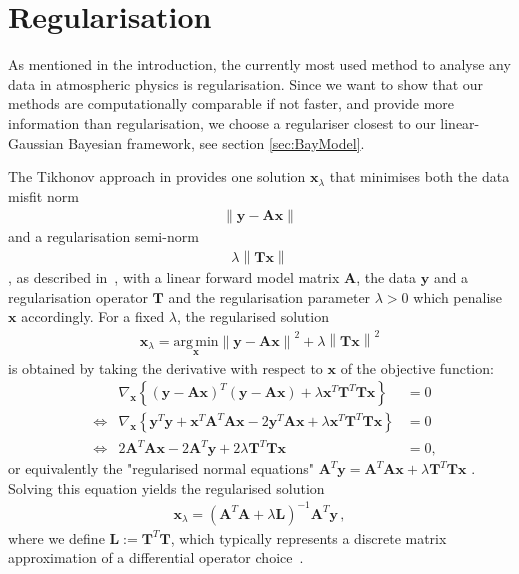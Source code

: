 \section{Regularisation}
\label{sec:regularise}
As mentioned in the introduction, the currently most used method to analyse any data in atmospheric physics is regularisation.
Since we want to show that our methods are computationally comparable if not faster, and provide more information than regularisation, we choose a regulariser closest to our linear-Gaussian Bayesian framework, see section \ref{sec:BayModel}.

The Tikhonov approach in provides one solution $\bm{x}_{\lambda}$ that minimises both the data misfit norm
\begin{align}
	\left\lVert \bm{y} - \bm{A} \bm{x} \right\rVert
\end{align} and a regularisation semi-norm
\begin{align}
	\lambda \left\lVert \bm{T} \bm{x} \right\rVert
\end{align}, as described in~\cite{fox2016fast}, with a linear forward model matrix $\bm{A}$, the data $\bm{y}$ and a regularisation operator $\bm{T}$ and the regularisation parameter $\lambda > 0$ which penalise $\bm{x}$ accordingly.
For a fixed $\lambda$, the regularised solution
\begin{align}
	\bm{x}_{\lambda} = \underset{\bm{x}}{\mathrm{arg\,min}} \left\lVert \bm{y} - \bm{A} \bm{x} \right\rVert^2 + \lambda \left\lVert \bm{T} \bm{x} \right\rVert^2
\end{align}
is obtained by taking the derivative with respect to $\bm{x}$ of the objective function:
\begin{align}
	& & \nabla_{\bm{x}} \left\{ (\bm{y} - \bm{A} \bm{x})^T (\bm{y} - \bm{A} \bm{x}) + \lambda \bm{x}^T \bm{T}^T \bm{T} \bm{x} \right\} &= 0 \\
	&\iff & \nabla_{\bm{x}} \left\{ \bm{y}^T \bm{y} + \bm{x}^T \bm{A}^T \bm{A} \bm{x} - 2 \bm{y}^T \bm{A} \bm{x} + \lambda \bm{x}^T \bm{T}^T \bm{T} \bm{x} \right\} &= 0 \\
	&\iff & 2 \bm{A}^T \bm{A} \bm{x} - 2 \bm{A}^T \bm{y} + 2 \lambda \bm{T}^T \bm{T} \bm{x} &= 0,
\end{align}
or equivalently the "regularised normal equations" $\bm{A}^T \bm{y} = \bm{A}^T \bm{A} \bm{x} + \lambda \bm{T}^T \bm{T} \bm{x}$ \cite{Hansen2001LCurve}.
Solving this equation yields the regularised solution
\begin{align}
	\bm{x}_{\lambda} = (\bm{A}^T \bm{A} + \lambda \bm{L})^{-1} \bm{A}^T \bm{y} \, , \label{eq:regSol}
\end{align}
where we define $\bm{L} := \bm{T}^T \bm{T}$, which typically represents a discrete matrix approximation of a differential operator choice~\cite{tan2016LecNot}.

